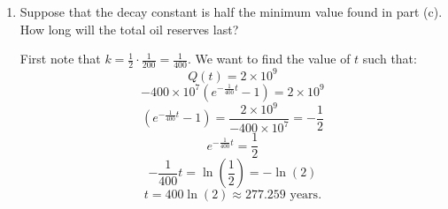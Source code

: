 \documentclass[handout,nooutcomes]{ximera}
\begin{document}
\begin{problem}
\begin{enumerate}
		
		
	\item  Suppose that the decay constant is half the minimum value found in part (c).  
	How long will the total oil reserves last?
		\begin{freeResponse}
		First note that $k = \frac{1}{2} \cdot \frac{1}{200} = \frac{1}{400}$.  
		We want to find the value of $t$ such that:
			\begin{equation*}
			Q(t) = 2 \times 10^9
			\end{equation*}
			\begin{equation*}
			- 400 \times 10^7 \left(e^{-\frac{1}{400}t}-1 \right) = 2 \times 10^9
			\end{equation*}
			\begin{equation*}
			\left(e^{-\frac{1}{400}t}-1 \right) = \frac{2 \times 10^9}{-400 \times 10^7} = - \frac{1}{2}
			\end{equation*}
			\begin{equation*}
			e^{-\frac{1}{400}t} = \frac{1}{2}
			\end{equation*}
			\begin{equation*}
			-\frac{1}{400}t=\ln \left(\frac{1}{2} \right) = -\ln(2)
			\end{equation*}
			\begin{equation*}
			t = 400 \ln(2) \approx 277.259 \text{ years}.
			\end{equation*}
		\end{freeResponse}
		
		
		
	\end{enumerate}
		
		
		

\end{problem}




















	
	
	
	
	
	
	
	
	

	










								
				
				
	
\end{document}
